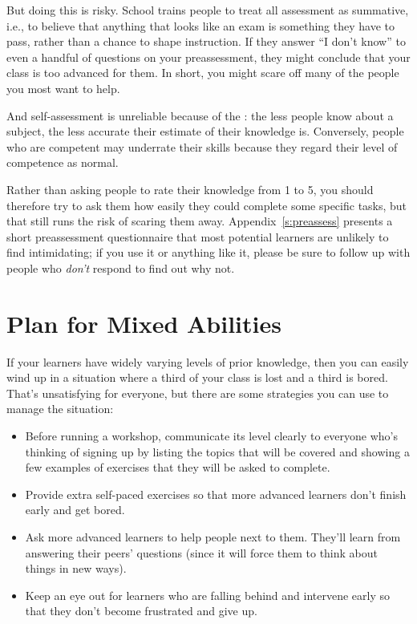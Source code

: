 But doing this is risky. School trains people to treat all assessment as
summative, i.e., to believe that anything that looks like an exam is
something they have to pass, rather than a chance to shape instruction.
If they answer ``I don't know'' to even a handful of questions on your
preassessment, they might conclude that your class is too advanced for
them. In short, you might scare off many of the people you most want to
help.

And self-assessment is unreliable because of the  \cite{Krug1999}: the less people know
about a subject, the less accurate their estimate of their knowledge
is. Conversely, people who are competent may underrate their skills
because they regard their level of competence as normal.

Rather than asking people to rate their knowledge from 1 to 5, you
should therefore try to ask them how easily they could complete some
specific tasks, but that still runs the risk of scaring them away.
Appendix~\ref{s:preassess} presents a short preassessment questionnaire
that most potential learners are unlikely to find intimidating; if you
use it or anything like it, please be sure to follow up with people who
\emph{don't} respond to find out why not.

\section{Plan for Mixed Abilities}\label{s:classroom-mixed}

If your learners have widely varying levels of prior knowledge, then you
can easily wind up in a situation where a third of your class is lost
and a third is bored. That's unsatisfying for everyone, but there are
some strategies you can use to manage the situation:

\begin{itemize}
\item
  Before running a workshop, communicate its level clearly to everyone
  who's thinking of signing up by listing the topics that will be
  covered and showing a few examples of exercises that they will be
  asked to complete.
\item
  Provide extra self-paced exercises so that more advanced learners
  don't finish early and get bored.
\item
  Ask more advanced learners to help people next to them. They'll
  learn from answering their peers' questions (since it will force
  them to think about things in new ways).
\item
  Keep an eye out for learners who are falling behind and intervene
  early so that they don't become frustrated and give up.
\end{itemize}

